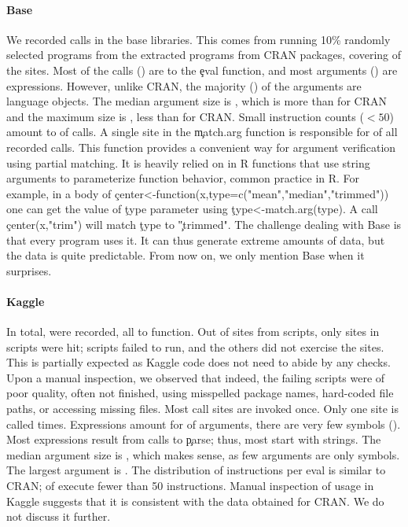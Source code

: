 \documentclass[review,screen,acmsmall]{acmart}
\begin{document}
\paragraph{Base}\label{sec:usage-base}

We recorded \baseAllcalls \eval calls in the \BasePackages base libraries. This
comes from running 10\% randomly selected programs from the
\CranRunnableScriptsRnd extracted programs from CRAN packages, covering
\baseTriggeredevalpct of the \BaseEvalCallSites sites. Most of the calls
(\baseEvalsratio) are to the \c{eval} function, and most arguments
(\baseCodepercent) are expressions. However, unlike CRAN, the majority
(\baseLanguagepercent) of the arguments are language objects. The median
argument size is \baseMedianszeval, which is more than for CRAN and the maximum
size is \baseMaxszeval, less than for CRAN. Small instruction counts ($<50$)
amount to \baseSmalleventspct of calls. A single site in the \c{match.arg}
function is responsible for \baseTopFuncPercent of all recorded calls. This
function provides a convenient way for argument verification using partial
matching. It is heavily relied on in R functions that use string arguments to
parameterize function behavior, common practice in R. For example, in a body of
\c{center<-function(x,type=c("mean","median","trimmed"))} one can get the
value of \c{type} parameter using \c{type<-match.arg(type)}. A call
\c{center(x,"trim")} will match \c{type} to \c{"trimmed"}. The challenge
dealing with Base is that every program uses it. It can thus generate extreme
amounts of data, but the data is quite predictable. From now on, we only mention
Base when it surprises.


\paragraph{Kaggle}

In total, \kaggleAllcalls \eval were recorded, all to \eval function. Out of
\kaggleStaticeval sites from \KaggleWithEvals scripts, only \kaggleTriggeredeval
sites in \kaggleNbruns scripts were hit; \KaggleFailedScripts scripts failed to
run, and the others did not exercise the \eval sites. This is partially expected
as Kaggle code does not need to abide by any checks. Upon a manual inspection,
we observed that indeed, the failing scripts were of poor quality, often not
finished, using misspelled package names, hard-coded file paths, or accessing
missing files. Most call sites are invoked once. Only one site is called
\kaggleMaxcalls times. Expressions amount for \kaggleCodepercent of arguments,
there are very few symbols (\kaggleSymbolpercent). Most expressions result from
calls to \c{parse}; thus, most \evals start with strings. The median argument
size is \kaggleMedianszeval, which makes sense, as few arguments are only
symbols. The largest argument is \kaggleMaxszeval. The distribution of
instructions per eval is similar to CRAN; \kaggleSmalleventspct of \evals
execute fewer than 50 instructions. Manual inspection of \eval usage in Kaggle
suggests that it is consistent with the data obtained for CRAN. We do not
discuss it further.
\end{document}
